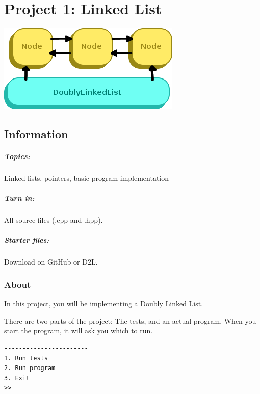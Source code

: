 \documentclass[a4paper,12pt,onepage]{book}
\title{}
\author{Rachel Morris}
\date{\today}
\begin{document}
    \chapter*{Project 1: Linked List} 
    
        \begin{center}
            \includegraphics{images/linked-list-title.png}
        \end{center}

        \section*{Information}
            \paragraph{ Topics: } Linked lists, pointers, basic program implementation
            \paragraph{ Turn in: } All source files (.cpp and .hpp).
            \paragraph{ Starter files: } Download on GitHub or D2L.
        
        \subsection*{About}
    
            In this project, you will be implementing a Doubly Linked List.
            
            There are two parts of the project: The tests, and an actual program.
            When you start the program, it will ask you which to run.
            
\begin{lstlisting}[style=output]
-----------------------
1. Run tests
2. Run program
3. Exit
>> 
\end{lstlisting}
\end{document}
